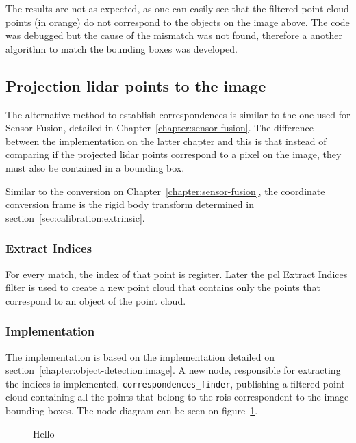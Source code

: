 The results are not as expected, as one can easily see that the filtered point cloud points (in orange) do not correspond to the objects on the image above. The code was debugged but the cause of the mismatch was not found, therefore a another algorithm to match the bounding boxes was developed. 


\subsection{Projection \ac{lidar} points to the image}
The alternative method to establish correspondences is similar to the one used for Sensor Fusion, detailed in Chapter~\ref{chapter:sensor-fusion}. The difference between the implementation on the latter chapter and this is that instead of comparing if the projected \ac{lidar} points correspond to a pixel on the image, they must also be contained in a bounding box. 

Similar to the conversion on Chapter~\ref{chapter:sensor-fusion}, the coordinate conversion frame is the rigid body transform determined in section~\ref{sec:calibration:extrinsic}.

\subsubsection{Extract Indices}
For every match, the index of that point is register. Later the \ac{pcl} Extract Indices filter is used to create a new point cloud that contains only the points that correspond to an object of the point cloud.

\subsubsection{Implementation}
The implementation is based on the implementation detailed on section~\ref{chapter:object-detection:image}. A new node, responsible for extracting the indices is implemented, \texttt{correspondences\_finder}, publishing a filtered point cloud containing all the points that belong to the \acp{roi} correspondent to the image bounding boxes. The node diagram can be seen on figure~\ref{fig:correspondences-finder-standalone}.

\begin{figure}[H]
	\centering
	\def\svgwidth{\columnwidth}
	\graphicspath{{img/image-object-to-point-cloud/}}
		
	\caption{Hello}
	\label{fig:correspondences-finder-standalone}
\end{figure}

